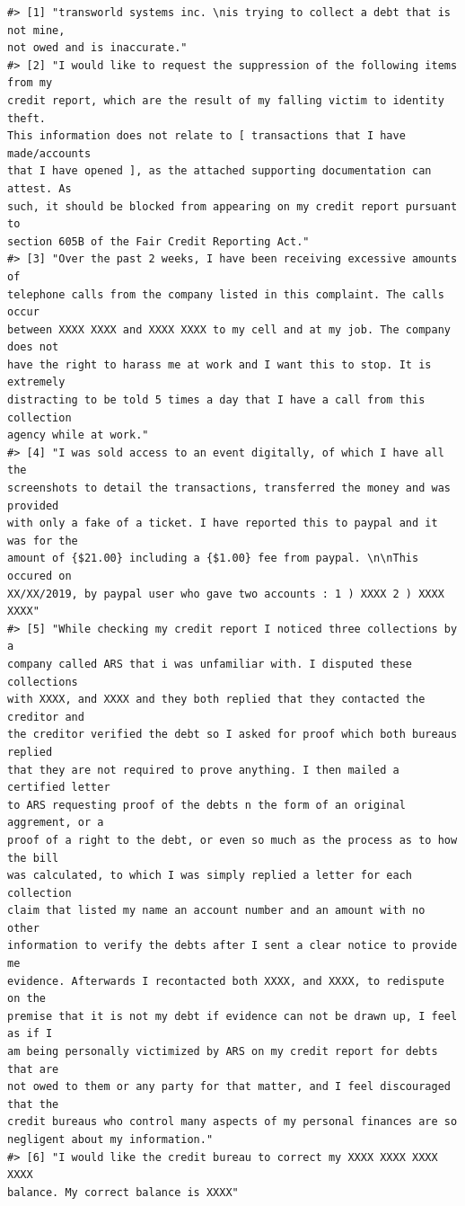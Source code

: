 \documentclass[
]{krantz}
\begin{document}
\begin{verbatim}
#> [1] "transworld systems inc. \nis trying to collect a debt that is not mine,
not owed and is inaccurate."
#> [2] "I would like to request the suppression of the following items from my
credit report, which are the result of my falling victim to identity theft.
This information does not relate to [ transactions that I have made/accounts
that I have opened ], as the attached supporting documentation can attest. As
such, it should be blocked from appearing on my credit report pursuant to
section 605B of the Fair Credit Reporting Act."
#> [3] "Over the past 2 weeks, I have been receiving excessive amounts of
telephone calls from the company listed in this complaint. The calls occur
between XXXX XXXX and XXXX XXXX to my cell and at my job. The company does not
have the right to harass me at work and I want this to stop. It is extremely
distracting to be told 5 times a day that I have a call from this collection
agency while at work."
#> [4] "I was sold access to an event digitally, of which I have all the
screenshots to detail the transactions, transferred the money and was provided
with only a fake of a ticket. I have reported this to paypal and it was for the
amount of {$21.00} including a {$1.00} fee from paypal. \n\nThis occured on
XX/XX/2019, by paypal user who gave two accounts : 1 ) XXXX 2 ) XXXX XXXX"
#> [5] "While checking my credit report I noticed three collections by a
company called ARS that i was unfamiliar with. I disputed these collections
with XXXX, and XXXX and they both replied that they contacted the creditor and
the creditor verified the debt so I asked for proof which both bureaus replied
that they are not required to prove anything. I then mailed a certified letter
to ARS requesting proof of the debts n the form of an original aggrement, or a
proof of a right to the debt, or even so much as the process as to how the bill
was calculated, to which I was simply replied a letter for each collection
claim that listed my name an account number and an amount with no other
information to verify the debts after I sent a clear notice to provide me
evidence. Afterwards I recontacted both XXXX, and XXXX, to redispute on the
premise that it is not my debt if evidence can not be drawn up, I feel as if I
am being personally victimized by ARS on my credit report for debts that are
not owed to them or any party for that matter, and I feel discouraged that the
credit bureaus who control many aspects of my personal finances are so
negligent about my information."
#> [6] "I would like the credit bureau to correct my XXXX XXXX XXXX XXXX
balance. My correct balance is XXXX"
\end{verbatim}
\end{document}
